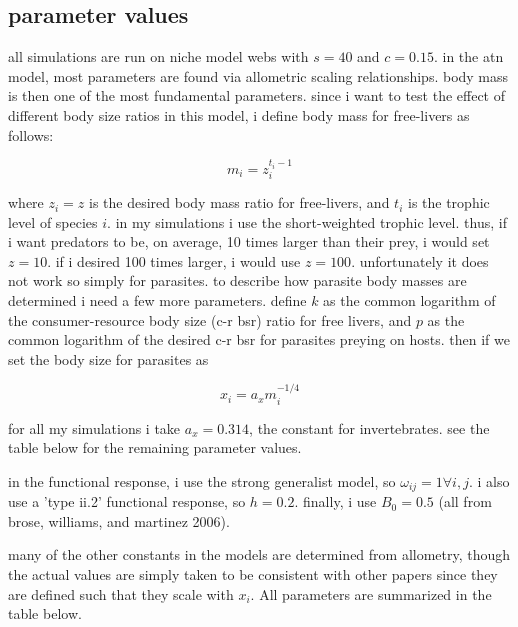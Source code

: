 \documentclass[11pt]{amsart}
\begin{document}
\subsection{parameter values}
all simulations are run on niche model webs with $s = 40$ and $c = 0.15$.  in the atn model, most parameters are found via allometric scaling relationships.  body mass is then one of the most fundamental parameters.  since i want to test the effect of different body size ratios in this model, i define body mass for free-livers as follows:

\begin{equation}
m_i = z_i^{t_i-1} \label{mf}
\end{equation}


where $z_i=z$ is the desired body mass ratio for free-livers, and $t_{i}$ is the trophic level of species $i$.  in my simulations i use the short-weighted trophic level.  thus, if i want predators to be, on average, 10 times larger than their prey, i would set $z = 10$.  if i desired 100 times larger, i would use $z=100$.  unfortunately it does not work so simply for parasites.  to describe how parasite body masses are determined i need a few more parameters. define $k$ as the common logarithm of the consumer-resource body size (c-r bsr) ratio for free livers, and $p$ as the common logarithm of the desired  c-r bsr for parasites preying on hosts.  then if we set the body size for parasites as 


\begin{equation}
x_i = a_xm_i^{-1/4}\label{xeq}
\end{equation}

for all my simulations i take $a_x = 0.314$, the constant for invertebrates.  see the table below for the remaining parameter values.

in the functional response, i use the strong generalist model, so $\omega_{ij} = 1 \forall i,j$.  i also use a 'type ii.2' functional response, so $h = 0.2$.  finally, i use $B_0 = 0.5$ (all from brose, williams, and martinez 2006).

many of the other constants in the models are determined from allometry, though the actual values are simply taken to be consistent with other papers since they are defined such that they scale with $x_i$.  All parameters are summarized in the table below.
\end{document}
